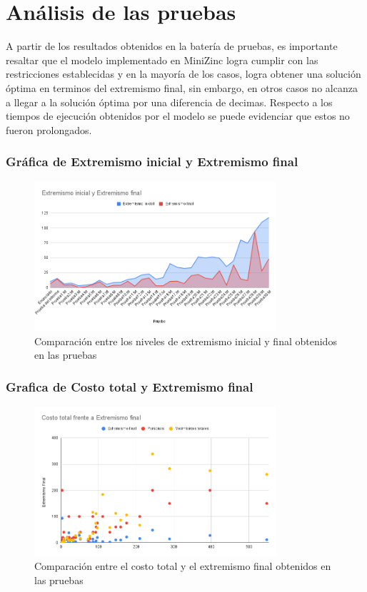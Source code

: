 \documentclass[11pt,letter]{article}
\begin{document}
\section{Análisis de las pruebas}

A partir de los resultados obtenidos en la batería de pruebas, es importante resaltar que el modelo implementado en MiniZinc logra cumplir con las restricciones establecidas y en la mayoría de los casos, logra obtener una solución óptima en terminos del extremismo final, sin embargo, en otros casos no alcanza a llegar a la solución óptima por una diferencia de decimas. Respecto a los tiempos de ejecución obtenidos por el modelo se puede evidenciar que estos no fueron prolongados.


\subsubsection*{Gráfica de Extremismo inicial y Extremismo final}

\begin{figure}[H]
    \centering
    \includegraphics[width=0.8\textwidth]{resources/extremismoiyf.png}
    \caption{Comparación entre los niveles de extremismo inicial y final obtenidos en las pruebas}
\end{figure}

\subsubsection*{Grafica de Costo total y Extremismo final}

\begin{figure}[H]
    \centering
    \includegraphics[width=0.8\textwidth]{resources/costototalvsextremismofinal.png}
    \caption{Comparación entre el costo total y el extremismo final obtenidos en las pruebas}
\end{figure}
\end{document}
